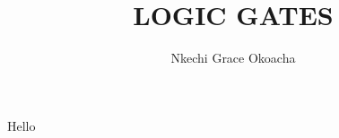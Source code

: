 \documentclass{article}
\author{Nkechi Grace Okoacha}
\title{LOGIC GATES}
\begin{document}
	\newpage
	\maketitle
	Hello
\end{document}

